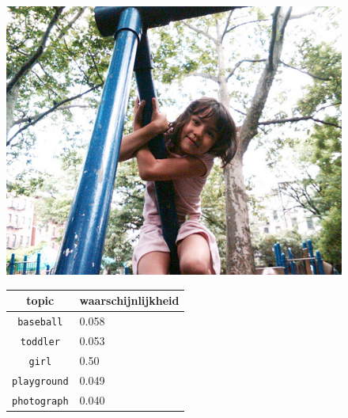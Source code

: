 \begin{figure}[h]
    \centering
    \begin{minipage}[t]{.5\linewidth}
    \centering
    \vspace{0pt}
    \includegraphics[width=\textwidth]{Images/LDA/3643021980.jpg}
    \end{minipage}\hfill
    \begin{minipage}[t]{.5\textwidth}
    \centering
    \vspace{0pt}
    \begin{tabular}{cl}
            topic                           & waarschijnlijkheid\\
            \hline
            \texttt{baseball}             & 0.058 \\
            \texttt{toddler}                   & 0.053 \\
            \texttt{girl}                 & 0.50 \\
            \texttt{playground}           & 0.049 \\
            \texttt{photograph}        & 0.040\\
            \hline
        \end{tabular}
    \end{minipage}
\end{figure}

